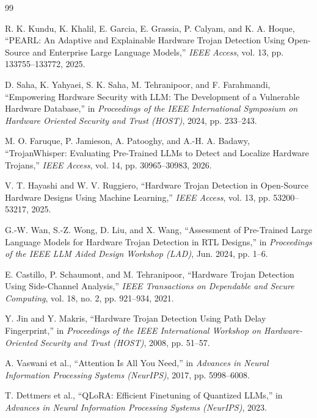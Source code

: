 \documentclass[12pt,a4paper]{report}
\renewcommand{\bibname}{}
\begin{document}

\renewcommand{\bibname}{REFERENCES}
\thispagestyle{plain}

\begin{thebibliography}{99}

R. K. Kundu, K. Khalil, E. Garcia, E. Grassia, P. Calyam, and K. A. Hoque,
``PEARL: An Adaptive and Explainable Hardware Trojan Detection Using Open-Source and Enterprise Large Language Models,''
\textit{IEEE Access}, vol. 13, pp. 133755--133772, 2025.

D. Saha, K. Yahyaei, S. K. Saha, M. Tehranipoor, and F. Farahmandi,
``Empowering Hardware Security with LLM: The Development of a Vulnerable Hardware Database,''
in \textit{Proceedings of the IEEE International Symposium on Hardware Oriented Security and Trust (HOST)}, 2024, pp. 233--243.

M. O. Faruque, P. Jamieson, A. Patooghy, and A.-H. A. Badawy,
``TrojanWhisper: Evaluating Pre-Trained LLMs to Detect and Localize Hardware Trojans,''
\textit{IEEE Access}, vol. 14, pp. 30965--30983, 2026.

V. T. Hayashi and W. V. Ruggiero,
``Hardware Trojan Detection in Open-Source Hardware Designs Using Machine Learning,''
\textit{IEEE Access}, vol. 13, pp. 53200--53217, 2025.

G.-W. Wan, S.-Z. Wong, D. Liu, and X. Wang,
``Assessment of Pre-Trained Large Language Models for Hardware Trojan Detection in RTL Designs,''
in \textit{Proceedings of the IEEE LLM Aided Design Workshop (LAD)}, Jun. 2024, pp. 1--6.

E. Castillo, P. Schaumont, and M. Tehranipoor,
``Hardware Trojan Detection Using Side-Channel Analysis,''
\textit{IEEE Transactions on Dependable and Secure Computing},
vol. 18, no. 2, pp. 921--934, 2021.

Y. Jin and Y. Makris,
``Hardware Trojan Detection Using Path Delay Fingerprint,''
in \textit{Proceedings of the IEEE International Workshop on Hardware-Oriented Security and Trust (HOST)}, 2008, pp. 51--57.

A. Vaswani et al.,
``Attention Is All You Need,''
in \textit{Advances in Neural Information Processing Systems (NeurIPS)}, 2017, pp. 5998--6008.

T. Dettmers et al.,
``QLoRA: Efficient Finetuning of Quantized LLMs,''
in \textit{Advances in Neural Information Processing Systems (NeurIPS)}, 2023.


\end{thebibliography}
\end{document}
